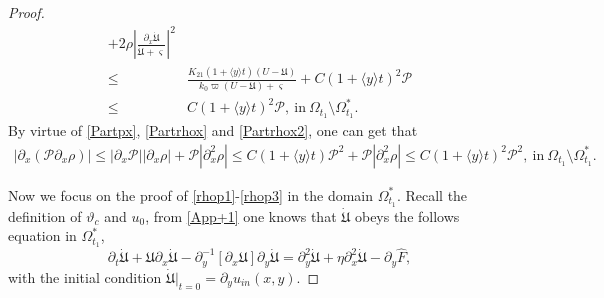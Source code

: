 \documentclass{amsart}
\numberwithin{equation}{section}
\newcommand\y{{{\langle y \rangle}}}
\begin{document}
\begin{proof}
\begin{align}
     +2\rho\left|\frac{\partial_{x}\dot{\mathfrak{U}}}{\dot{\mathfrak{U}}+\varsigma}\right|^{2}\\
\leq& \frac{K_{21}(1+\y t)(U-\mathfrak{U})}{k_{0}\varpi(U-\mathfrak{U})+\varsigma}
     +C(1+\y t)^{2}\mathcal{P}\nonumber\\
\leq& C(1+\y t)^{2}\mathcal{P},~\text{in}~\Omega_{t_{1}}\setminus\Omega_{t_{1}}^{*}.\nonumber
\end{align}
By virtue of \eqref{Partpx}, \eqref{Partrhox} and \eqref{Partrhox2}, one can get that
\begin{align}\label{Partrhopx}
|\partial_{x}(\mathcal{P}\partial_{x}\rho)|
\leq |\partial_{x}\mathcal{P}||\partial_{x}\rho|+\mathcal{P}|\partial_{x}^{2}\rho|
\leq C(1+\y t)\mathcal{P}^{2}+\mathcal{P}|\partial_{x}^{2}\rho|
\leq C(1+\y t)^{2}\mathcal{P}^{2},~\text{in}~\Omega_{t_{1}}\setminus\Omega_{t_{1}}^{*}.
\end{align}


Now we focus on the proof of \eqref{rhop1}-\eqref{rhop3} in the domain $\Omega_{t_{1}}^{*}$. Recall the definition of $\vartheta_{c}$ and $u_{0}$, from \eqref{App+1} one knows that $\dot{\mathfrak{U}}$ obeys the follows equation in $\Omega_{t_{1}}^{*}$,
\begin{equation}\label{partdotu}
\partial_{t}\dot{\mathfrak{U}}
+\mathfrak{U}\partial_{x}\dot{\mathfrak{U}}
-\partial_{y}^{-1}[\partial_{x}\mathfrak{U}]\partial_{y}\dot{\mathfrak{U}}
=\partial_{y}^{2}\dot{\mathfrak{U}}+\eta\partial_{x}^{2}\dot{\mathfrak{U}}-\partial_{y}\hat{F},
\end{equation}
with the initial condition $\dot{\mathfrak{U}}|_{t=0}=\partial_{y}u_{in}(x,y)$.


\end{proof}
\end{document}
